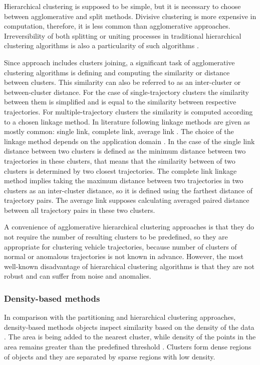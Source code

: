 Hierarchical clustering is supposed to be simple, but it is necessary to choose between agglomerative and split methods. Divisive clustering is more expensive in computation, therefore, it is less common than agglomerative approaches. Irreversibility of both splitting or uniting processes in traditional hierarchical clustering algorithms is also a particularity of such algorithms \cite{article:8_review_mot_cl_alg}.

Since approach includes clusters joining, a significant task of agglomerative clustering algorithms is defining and computing the similarity or distance between clusters. This similarity can also be referred to as an inter-cluster or between-cluster distance. For the case of single-trajectory clusters the similarity between them is simplified and is equal to the similarity between respective trajectories. For multiple-trajectory clusters the similarity is computed according to a chosen linkage method. In literature following linkage methods are given as mostly common: single link, complete link, average link \cite{article:23_survey_ca}\cite{inproceedings:7_related_work}. The choice of the linkage method depends on the application domain \cite{online:what_is_hier_clust}. In the case of the single link distance between two clusters is defined as the minimum distance between two trajectories in these clusters, that means that the similarity between of two clusters is determined by two closest trajectories. The complete link linkage method implies taking the maximum distance between two trajectories in two clusters as an inter-cluster distance, so it is defined using the farthest distance of trajectory pairs. The average link supposes calculating averaged paired distance between all trajectory pairs in these two clusters.

A convenience of agglomerative hierarchical clustering approaches is that they do not require the number of resulting clusters to be predefined, so they are appropriate for clustering vehicle trajectories, because number of clusters of normal or anomalous trajectories is not known in advance. However, the most well-known disadvantage of hierarchical clustering algorithms is that they are not robust and can suffer from noise and anomalies. 

\subsubsection{Density-based methods}
In comparison with the partitioning and hierarchical clustering approaches, density-based methods objects inspect similarity based on the density of the data \cite{article:22_survey_dscc}. The area is being added to the nearest cluster, while density of the points in the area remains greater than the predefined threshold \cite{article:8_review_mot_cl_alg}. Clusters form dense regions of objects and they are separated by sparse regions with low density.

